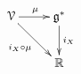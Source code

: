 \documentclass{article}
\newcommand{\R}{\mathbb{R}}%
\newcommand{\V}{\mathcal{V}}%
\newcommand{\g}{\mathfrak{g}}
\begin{document}
\thispagestyle{empty}
$$
\xymatrix{
  \V \ar[r]^\mu \ar[dr]_{i_X \circ \mu} & \g^*\ar[d]^{i_X} \\
  & \R}
$$
\end{document}
